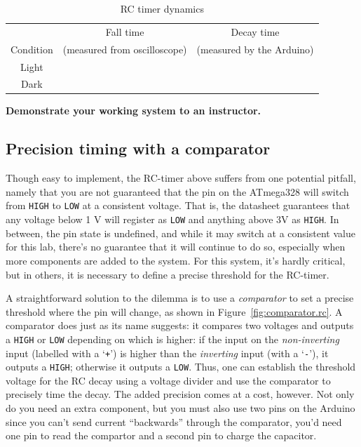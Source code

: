 \documentclass[11pt]{article} %
\begin{document}
\begin{enumerate}
\begin{table}[htp]
\begin{center}
\begin{tabular}{|c|c|c|}
 & Fall time & Decay time \\
Condition & (measured from oscilloscope) & (measured by the Arduino)\\
 \hline
Light & &\\
Dark & &\\
\end{tabular}
\end{center}
\caption{RC timer dynamics}
\label{tab:rc.dynamics}
\end{table}%

\end{enumerate}

{\bf Demonstrate your working system to an instructor.}

\subsection*{Precision timing with a comparator}

Though easy to implement, the RC-timer above suffers from one potential pitfall, namely that you are not guaranteed that the pin on the ATmega328 will switch from \verb!HIGH! to \verb|LOW| at a consistent voltage. That is, the datasheet guarantees that any voltage below 1 V will register as \verb|LOW| and anything above 3V as \verb|HIGH|. In between, the pin state is undefined, and while it may switch at a consistent value for this lab, there’s no guarantee that it will continue to do so, especially when more components are added to the system. For this system, it’s hardly critical, but in others, it is necessary to define a precise threshold for the RC-timer.

A straightforward solution to the dilemma is to use a \emph{comparator} to set a precise threshold where the pin will change, as shown in Figure~\ref{fig:comparator.rc}. A comparator does just as its name suggests: it compares two voltages and outputs a \verb|HIGH| or \verb|LOW| depending on which is higher: if the input on the \emph{non-inverting} input (labelled with a ‘\verb|+|’) is higher than the \emph{inverting} input (with a ‘\verb|-|’), it outputs a \verb|HIGH|; otherwise it outputs a \verb|LOW|. Thus, one can establish the threshold voltage for the RC decay using a voltage divider and use the comparator to precisely time the decay. The added precision comes at a cost, however. Not only do you need an extra component, but you must also use two pins on the Arduino since you can’t send current “backwards” through the comparator, you’d need one pin to read the compartor and a second pin to charge the capacitor.
\end{document}
